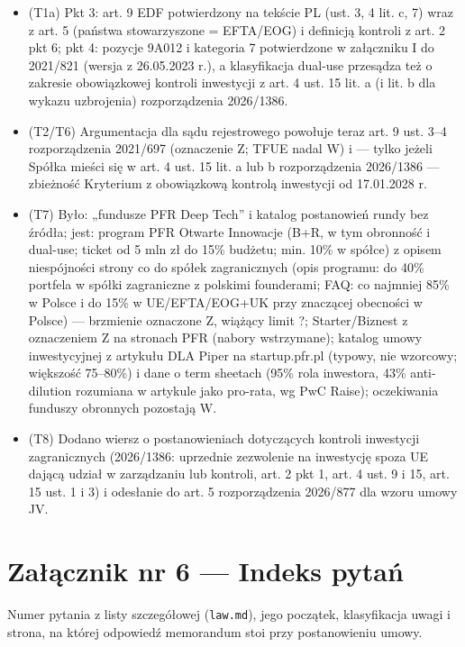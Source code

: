 \documentclass[12pt,a4paper]{report}
\begin{document}
\begin{itemize}
  \item (T1a) Pkt 3: art. 9 EDF potwierdzony na tekście PL (ust. 3, 4 lit. c, 7) wraz z art. 5 (państwa stowarzyszone = EFTA/EOG) i definicją kontroli z art. 2 pkt 6; pkt 4: pozycje 9A012 i kategoria 7 potwierdzone w załączniku I do 2021/821 (wersja z 26.05.2023 r.), a klasyfikacja dual-use przesądza też o zakresie obowiązkowej kontroli inwestycji z art. 4 ust. 15 lit. a (i lit. b dla wykazu uzbrojenia) rozporządzenia 2026/1386.
  \item (T2/T6) Argumentacja dla sądu rejestrowego powołuje teraz art. 9 ust. 3–4 rozporządzenia 2021/697 (oznaczenie Z; TFUE nadal W) i — tylko jeżeli Spółka mieści się w art. 4 ust. 15 lit. a lub b rozporządzenia 2026/1386 — zbieżność Kryterium z obowiązkową kontrolą inwestycji od 17.01.2028 r.
  \item (T7) Było: „fundusze PFR Deep Tech” i katalog postanowień rundy bez źródła; jest: program PFR Otwarte Innowacje (B+R, w tym obronność i dual-use; ticket od 5 mln zł do 15\% budżetu; min. 10\% w spółce) z opisem niespójności strony co do spółek zagranicznych (opis programu: do 40\% portfela w spółki zagraniczne z polskimi founderami; FAQ: co najmniej 85\% w Polsce i do 15\% w UE/EFTA/EOG+UK przy znaczącej obecności w Polsce) — brzmienie oznaczone Z, wiążący limit ?; Starter/Biznest z oznaczeniem Z na stronach PFR (nabory wstrzymane); katalog umowy inwestycyjnej z artykułu DLA Piper na startup.pfr.pl (typowy, nie wzorcowy; większość 75–80\%) i dane o term sheetach (95\% rola inwestora, 43\% anti-dilution rozumiana w artykule jako pro-rata, wg PwC Raise); oczekiwania funduszy obronnych pozostają W.
  \item (T8) Dodano wiersz o postanowieniach dotyczących kontroli inwestycji zagranicznych (2026/1386: uprzednie zezwolenie na inwestycję spoza UE dającą udział w zarządzaniu lub kontroli, art. 2 pkt 1, art. 4 ust. 9 i 15, art. 15 ust. 1 i 3) i odesłanie do art. 5 rozporządzenia 2026/877 dla wzoru umowy JV.
\end{itemize}

\clearpage
\section*{Załącznik nr 6 --- Indeks pytań}

Numer pytania z listy szczegółowej (\texttt{law.md}), jego początek, klasyfikacja uwagi i strona, na której odpowiedź memorandum stoi przy postanowieniu umowy.
\end{document}
